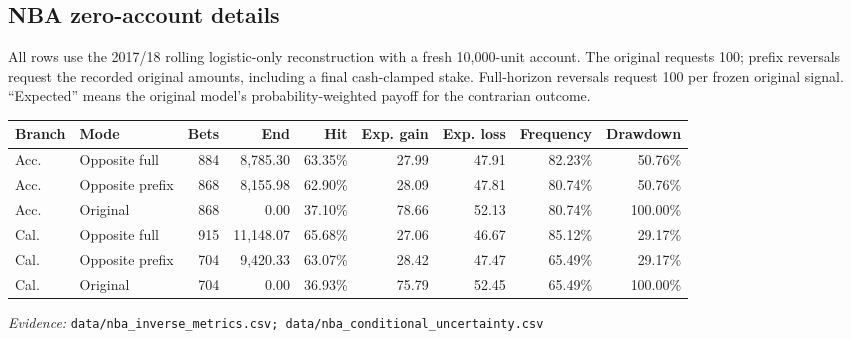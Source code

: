 \documentclass[11pt,letterpaper]{article}
\newcommand{\sourcefile}[1]{{\small\color{muted}\textit{Evidence:} \nolinkurl{#1}\par}}
\begin{document}
\subsection{NBA zero-account details}
All rows use the 2017/18 rolling logistic-only reconstruction with a fresh
10,000-unit account. The original requests 100; prefix reversals request the
recorded original amounts, including a final cash-clamped stake. Full-horizon
reversals request 100 per frozen original signal. ``Expected'' means the
original model's probability-weighted payoff for the contrarian outcome.
\begin{center}\scriptsize
\begin{tabular}{llrrrrrrr}
\toprule
Branch & Mode & Bets & End & Hit & Exp. gain & Exp. loss & Frequency & Drawdown \\ \midrule
Acc. & Opposite full & 884 & 8,785.30 & 63.35\% & 27.99 & 47.91 & 82.23\% & 50.76\% \\
Acc. & Opposite prefix & 868 & 8,155.98 & 62.90\% & 28.09 & 47.81 & 80.74\% & 50.76\% \\
Acc. & Original & 868 & 0.00 & 37.10\% & 78.66 & 52.13 & 80.74\% & 100.00\% \\
Cal. & Opposite full & 915 & 11,148.07 & 65.68\% & 27.06 & 46.67 & 85.12\% & 29.17\% \\
Cal. & Opposite prefix & 704 & 9,420.33 & 63.07\% & 28.42 & 47.47 & 65.49\% & 29.17\% \\
Cal. & Original & 704 & 0.00 & 36.93\% & 75.79 & 52.45 & 65.49\% & 100.00\% \\
\bottomrule
\end{tabular}

\end{center}
\sourcefile{data/nba_inverse_metrics.csv; data/nba_conditional_uncertainty.csv}

\end{document}
